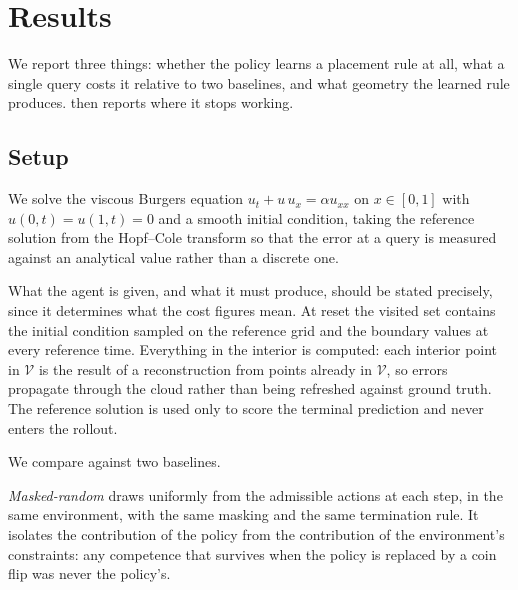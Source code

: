 
\section{Results}
\label{sec:results}

We report three things: whether the policy learns a placement rule at all, what
a single query costs it relative to two baselines, and what geometry the learned
rule produces.  then reports where it stops working.

\subsection{Setup}
\label{sec:results_setup}

We solve the viscous Burgers equation $u_t + u\,u_x = \alpha u_{xx}$ on
$x \in [0,1]$ with $u(0,t) = u(1,t) = 0$ and a smooth initial condition, taking
the reference solution from the Hopf--Cole transform so that the error at a
query is measured against an analytical value rather than a discrete one.

What the agent is given, and what it must produce, should be stated precisely,
since it determines what the cost figures mean. At reset the visited set
contains the initial condition sampled on the reference grid and the boundary
values at every reference time. Everything in the interior is computed: each
interior point in $\mathcal{V}$ is the result of a reconstruction from points
already in $\mathcal{V}$, so errors propagate through the cloud rather than
being refreshed against ground truth. The reference solution is used only to
score the terminal prediction and never enters the rollout.

We compare against two baselines.

\emph{Masked-random} draws uniformly from the admissible actions at each step,
in the same environment, with the same masking and the same termination rule.
It isolates the contribution of the policy from the contribution of the
environment's constraints: any competence that survives when the policy is
replaced by a coin flip was never the policy's.

